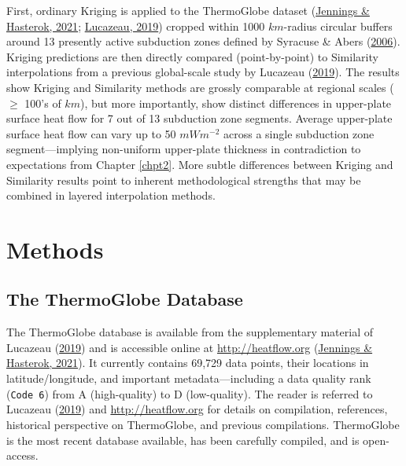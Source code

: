 First, ordinary Kriging is applied to the ThermoGlobe dataset (\protect\hyperlink{ref-jennings2021}{Jennings \& Hasterok, 2021}; \protect\hyperlink{ref-lucazeau2019}{Lucazeau, 2019}) cropped within 1000 \(km\)-radius circular buffers around 13 presently active subduction zones defined by Syracuse \& Abers (\protect\hyperlink{ref-syracuse2006}{2006}). Kriging predictions are then directly compared (point-by-point) to Similarity interpolations from a previous global-scale study by Lucazeau (\protect\hyperlink{ref-lucazeau2019}{2019}). The results show Kriging and Similarity methods are grossly comparable at regional scales (\(\geq\) 100's of \(km\)), but more importantly, show distinct differences in upper-plate surface heat flow for 7 out of 13 subduction zone segments. Average upper-plate surface heat flow can vary up to 50 \(mWm^{-2}\) across a single subduction zone segment---implying non-uniform upper-plate thickness in contradiction to expectations from Chapter \ref{chpt2}. More subtle differences between Kriging and Similarity results point to inherent methodological strengths that may be combined in layered interpolation methods.

\hypertarget{chpt3Methods}{%
\section{Methods}\label{chpt3Methods}}

\hypertarget{the-thermoglobe-database}{%
\subsection{The ThermoGlobe Database}\label{the-thermoglobe-database}}

The ThermoGlobe database is available from the supplementary material of Lucazeau (\protect\hyperlink{ref-lucazeau2019}{2019}) and is accessible online at \url{http://heatflow.org} (\protect\hyperlink{ref-jennings2021}{Jennings \& Hasterok, 2021}). It currently contains 69,729 data points, their locations in latitude/longitude, and important metadata---including a data quality rank (\texttt{Code\ 6}) from A (high-quality) to D (low-quality). The reader is referred to Lucazeau (\protect\hyperlink{ref-lucazeau2019}{2019}) and \url{http://heatflow.org} for details on compilation, references, historical perspective on ThermoGlobe, and previous compilations. ThermoGlobe is the most recent database available, has been carefully compiled, and is open-access.


